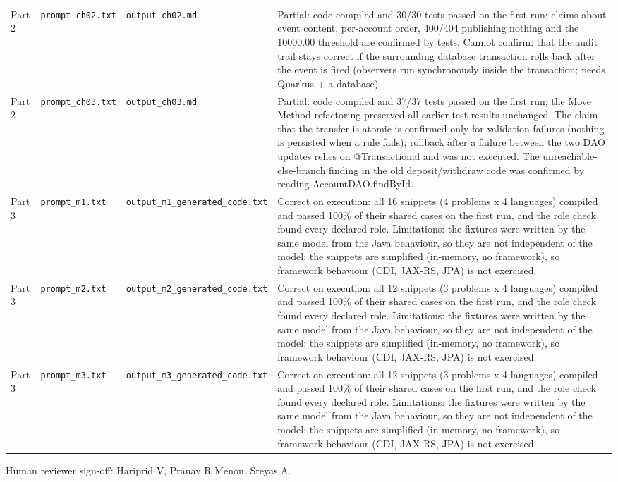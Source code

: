 \documentclass[11pt,a4paper]{article}
\begin{document}
{\begin{longtable}{@{}p{1.1cm}p{3cm}p{3.3cm}p{8.3cm}@{}}
Part 2 & \texttt{prompt\_\allowbreak{}ch02.\allowbreak{}txt} & \texttt{output\_\allowbreak{}ch02.\allowbreak{}md} & Partial: code compiled and 30/30 tests passed on the first run; claims about event content, per-account order, 400/404 publishing nothing and the 10000.00 threshold are confirmed by tests. Cannot confirm: that the audit trail stays correct if the surrounding database transaction rolls back after the event is fired (observers run synchronously inside the transaction; needs Quarkus + a database). \\
Part 2 & \texttt{prompt\_\allowbreak{}ch03.\allowbreak{}txt} & \texttt{output\_\allowbreak{}ch03.\allowbreak{}md} & Partial: code compiled and 37/37 tests passed on the first run; the Move Method refactoring preserved all earlier test results unchanged. The claim that the transfer is atomic is confirmed only for validation failures (nothing is persisted when a rule fails); rollback after a failure between the two DAO updates relies on @Transactional and was not executed. The unreachable-else-branch finding in the old deposit/withdraw code was confirmed by reading AccountDAO.findById. \\
Part 3 & \texttt{prompt\_\allowbreak{}m1.\allowbreak{}txt} & \texttt{output\_\allowbreak{}m1\_\allowbreak{}generated\_\allowbreak{}code.\allowbreak{}txt} & Correct on execution: all 16 snippets (4 problems x 4 languages) compiled and passed 100\% of their shared cases on the first run, and the role check found every declared role. Limitations: the fixtures were written by the same model from the Java behaviour, so they are not independent of the model; the snippets are simplified (in-memory, no framework), so framework behaviour (CDI, JAX-RS, JPA) is not exercised. \\
Part 3 & \texttt{prompt\_\allowbreak{}m2.\allowbreak{}txt} & \texttt{output\_\allowbreak{}m2\_\allowbreak{}generated\_\allowbreak{}code.\allowbreak{}txt} & Correct on execution: all 12 snippets (3 problems x 4 languages) compiled and passed 100\% of their shared cases on the first run, and the role check found every declared role. Limitations: the fixtures were written by the same model from the Java behaviour, so they are not independent of the model; the snippets are simplified (in-memory, no framework), so framework behaviour (CDI, JAX-RS, JPA) is not exercised. \\
Part 3 & \texttt{prompt\_\allowbreak{}m3.\allowbreak{}txt} & \texttt{output\_\allowbreak{}m3\_\allowbreak{}generated\_\allowbreak{}code.\allowbreak{}txt} & Correct on execution: all 12 snippets (3 problems x 4 languages) compiled and passed 100\% of their shared cases on the first run, and the role check found every declared role. Limitations: the fixtures were written by the same model from the Java behaviour, so they are not independent of the model; the snippets are simplified (in-memory, no framework), so framework behaviour (CDI, JAX-RS, JPA) is not exercised. \\
\end{longtable}
}
Human reviewer sign-off: Hariprid V, Pranav R Menon, Sreyas A.
\end{document}
